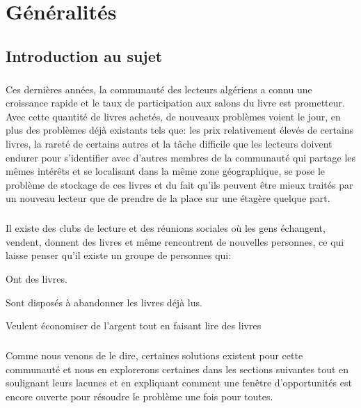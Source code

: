 

\chapter{Généralités}
\section{Introduction au sujet}

\paragraph*{}
Ces dernières années, la communauté des lecteurs algériens a connu une croissance rapide et le taux de participation aux salons du livre est prometteur. Avec cette quantité de livres achetés, de nouveaux problèmes voient le jour, en plus des problèmes déjà existants tels que: les prix relativement élevés de certains livres, la rareté de certains autres et la tâche difficile que les lecteurs doivent endurer pour s'identifier avec d'autres membres de la communauté qui partage les mêmes intérêts et se localisant dans la même zone géographique, se pose le problème de stockage de ces livres et du fait qu’ils peuvent être mieux traités par un nouveau lecteur que de prendre de la place sur une étagère quelque part.


\paragraph*{}
Il existe des clubs de lecture et des réunions sociales où les gens échangent, vendent, donnent des livres et même rencontrent de nouvelles personnes, ce qui laisse penser qu'il existe un groupe de personnes qui:

\begin{list}{•}{}
\item Ont des livres.
\item Sont disposés à abandonner les livres déjà lus.
\item Veulent économiser de l’argent tout en faisant lire des livres
\end{list}

\paragraph*{}
Comme nous venons de le dire, certaines solutions existent pour cette communauté et nous en explorerons certaines dans les sections suivantes tout en soulignant leurs lacunes et en expliquant comment une fenêtre d'opportunités est encore ouverte pour résoudre le problème une fois pour toutes.
\newpage

